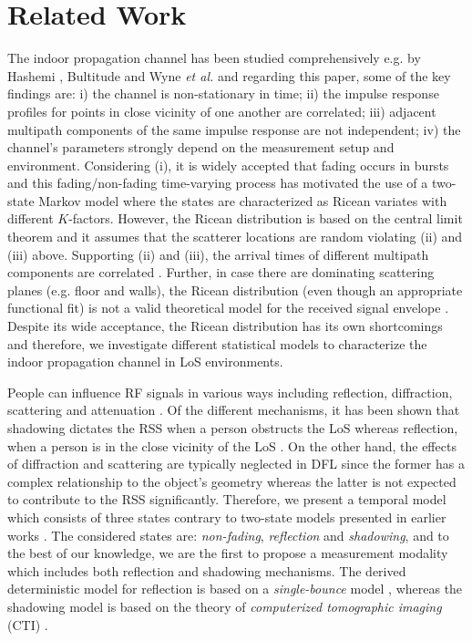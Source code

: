 \documentclass[journal, 10pt, twocolumn, balance]{IEEEtran}
\begin{document}
\section{Related Work} \label{S:related_work}
The indoor propagation channel has been studied comprehensively e.g. by Hashemi \cite{hashemi93}, Bultitude \cite{bultitude1987} and Wyne \emph{et al.} \cite{Wyne2009} and regarding this paper, some of the key findings are: i) the channel is non-stationary in time; ii) the impulse response profiles for points in close vicinity of one another are correlated; iii) adjacent multipath components of the same impulse response are not independent; iv) the channel's parameters strongly depend on the measurement setup and environment. Considering (i), it is widely accepted that fading occurs in bursts \cite{bultitude1987} and this fading/non-fading time-varying process has motivated the use of a two-state Markov model \cite{roberts1995} where the states are characterized as Ricean variates with different $K$-factors. However, the Ricean distribution is based on the central limit theorem and it assumes that the scatterer locations are random violating (ii) and (iii) above. Supporting (ii) and (iii), the arrival times of different multipath components are correlated \cite{hashemi93}. Further, in case there are dominating scattering planes (e.g. floor and walls), the Ricean distribution (even though an appropriate functional fit) is not a valid theoretical model for the received signal envelope \cite{Wyne2009}. Despite its wide acceptance, the Ricean distribution has its own shortcomings and therefore, we investigate different statistical models to characterize the indoor propagation channel in LoS environments.

People can influence RF signals in various ways including reflection, diffraction, scattering and attenuation \cite[Ch. 4]{Molisch2010}. Of the different mechanisms, it has been shown that shadowing dictates the RSS when a person obstructs the LoS \cite{patwari08} whereas reflection, when a person is in the close vicinity of the LoS \cite{patwari2011b}. On the other hand, the effects of diffraction and scattering are typically neglected in DFL since the former has a complex relationship to the object’s geometry \cite{patwari2011b} whereas the latter is not expected to contribute to the RSS significantly. Therefore, we present a temporal model which consists of three states contrary to two-state models presented in earlier works \cite{Wilson2012, Zheng2012}. The considered states are: \emph{non-fading}, \emph{reflection} and \emph{shadowing}, and to the best of our knowledge, we are the first to propose a measurement modality which includes both reflection and shadowing mechanisms. The derived deterministic model for reflection is based on a \emph{single-bounce} model \cite[pp. 114-125]{rappaport1996}, whereas the shadowing model is based on the theory of \emph{computerized tomographic imaging} (CTI) \cite[Ch. 3]{Kak1988}. 
\end{document}
